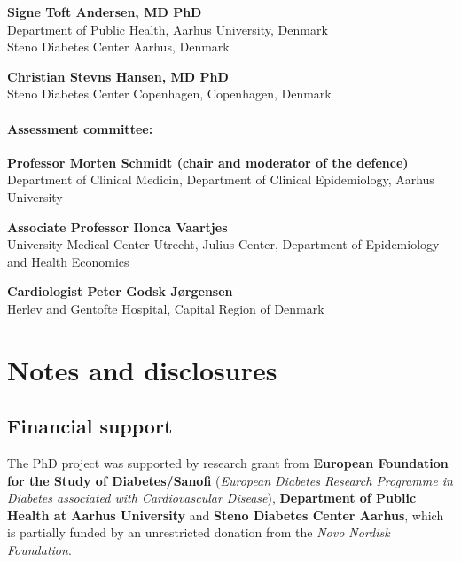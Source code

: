 \documentclass[
  letterpaper,
  headsepline=true,
  open=any]{scrbook}
\begin{document}
\textbf{Signe Toft Andersen, MD PhD}\\
Department of Public Health, Aarhus University, Denmark\\
Steno Diabetes Center Aarhus, Denmark

\textbf{Christian Stevns Hansen, MD PhD}\\
Steno Diabetes Center Copenhagen, Copenhagen, Denmark

\hypertarget{assessment-committee}{%
\subsubsection*{Assessment committee:}\label{assessment-committee}}

\textbf{Professor Morten Schmidt (chair and moderator of the defence)}\\
Department of Clinical Medicin, Department of Clinical Epidemiology,
Aarhus University

\textbf{Associate Professor Ilonca Vaartjes}\\
University Medical Center Utrecht, Julius Center, Department of
Epidemiology and Health Economics

\textbf{Cardiologist Peter Godsk Jørgensen}\\
Herlev and Gentofte Hospital, Capital Region of Denmark


\hypertarget{notes-and-disclosures}{%
\chapter*{Notes and disclosures}\label{notes-and-disclosures}}


\hypertarget{financial-support}{%
\section*{Financial support}\label{financial-support}}


The PhD project was supported by research grant from \textbf{European
Foundation for the Study of Diabetes/Sanofi} (\emph{European Diabetes
Research Programme in Diabetes associated with Cardiovascular Disease}),
\textbf{Department of Public Health at Aarhus University} and
\textbf{Steno Diabetes Center Aarhus}, which is partially funded by an
unrestricted donation from the \emph{Novo Nordisk Foundation}.
\end{document}
